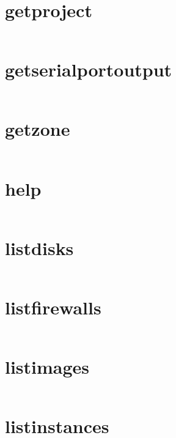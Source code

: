 \section{getproject}
\begin{lstlisting}[language=Bash]
\end{lstlisting}

\section{getserialportoutput}
\begin{lstlisting}[language=Bash]
\end{lstlisting}

\section{getzone}
\begin{lstlisting}[language=Bash]
\end{lstlisting}

\section{help}
\begin{lstlisting}[language=Bash]
\end{lstlisting}

\section{listdisks}
\begin{lstlisting}[language=Bash]
\end{lstlisting}

\section{listfirewalls}
\begin{lstlisting}[language=Bash]
\end{lstlisting}

\section{listimages}
\begin{lstlisting}[language=Bash]
\end{lstlisting}

\section{listinstances}
\begin{lstlisting}[language=Bash]
\end{lstlisting}

